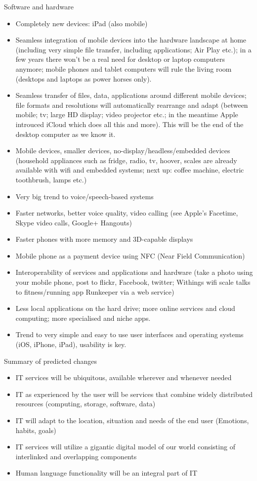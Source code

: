 \begin{multicols}{2}
Software and hardware

\begin{itemize}
\item Completely new devices: iPad (also mobile)
\item Seamless integration of mobile devices into the hardware landscape at home (including very simple file transfer, including applications; Air Play etc.); in a few years there won’t be a real need for desktop or laptop computers anymore; mobile phones and tablet computers will rule the living room (desktops and laptops as power horses only).
\item Seamless transfer of files, data, applications around different mobile devices; file formats and resolutions will automatically rearrange and adapt (between mobile; tv; large HD display; video projector etc.; in the meantime Apple introuced iCloud which does all this and more). This will be the end of the desktop computer as we know it.
\item Mobile devices, smaller devices, no-display/headless/embedded devices (household appliances such as fridge, radio, tv, hoover, scales are already available with wifi and embedded systems; next up: coffee machine, electric toothbrush, lamps etc.)
\item Very big trend to voice/speech-based systems
\item Faster networks, better voice quality, video calling (see Apple’s Facetime, Skype video calls, Google+ Hangouts)
\item Faster phones with more memory and 3D-capable displays
\item Mobile phone as a payment device using NFC (Near Field Communication)
\item Interoperability of services and applications and hardware (take a photo using your mobile phone, post to flickr, Facebook, twitter; Withings wifi scale talks to fitness/running app Runkeeper via a web service)
\item Less local applications on the hard drive; more online services and cloud computing; more specialised and niche apps.
\item Trend to very simple and easy to use user interfaces and operating systems (iOS, iPhone, iPad), usability is key.
\end{itemize}

Summary of predicted changes

\begin{itemize}
\item IT services will be ubiquitous, available wherever and whenever needed
\item IT as experienced by the user will be services that combine widely distributed resources (computing, storage, software, data)
\item IT will adapt to the location, situation and needs of the end user (Emotions, habits, goals)
\item IT services will utilize a gigantic digital model of our world consisting of interlinked and overlapping components
\item Human language functionality will be an integral part of IT
\end{itemize}


\end{multicols}
